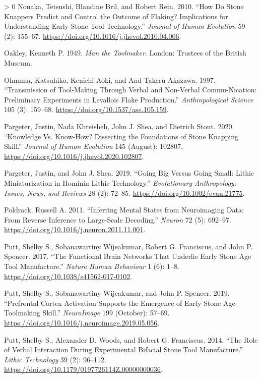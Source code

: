 \documentclass[smallextended]{svjour3}       %
\newlength{\cslhangindent}
\newenvironment{CSLReferences}[3] %
 {%
  \setlength{\parindent}{0pt}
  \ifodd #1 \everypar{\setlength{\hangindent}{\cslhangindent}}\ignorespaces\fi
  \ifnum #2 > 0
  \setlength{\parskip}{#3\baselineskip}
  \fi
 }%
 {}
\begin{document}
\begin{CSLReferences}{1}{0}
\leavevmode\hypertarget{ref-nonaka2010}{}%
Nonaka, Tetsushi, Blandine Bril, and Robert Rein. 2010. {``How Do Stone
Knappers Predict and Control the Outcome of Flaking? Implications for
Understanding Early Stone Tool Technology.''} \emph{Journal of Human
Evolution} 59 (2): 155--67.
\url{https://doi.org/10.1016/j.jhevol.2010.04.006}.

\leavevmode\hypertarget{ref-oakley1949}{}%
Oakley, Kenneth P. 1949. \emph{Man the Toolmaker}. London: Trustees of
the British Museum.

\leavevmode\hypertarget{ref-ohnuma1997}{}%
Ohnuma, Katsuhiko, Kenichi Aoki, and And Takeru Akazawa. 1997.
{``Transmission of Tool-Making Through Verbal and Non-Verbal
Commu-Nication: Preliminary Experiments in Levallois Flake
Production.''} \emph{Anthropological Science} 105 (3): 159--68.
\url{https://doi.org/10.1537/ase.105.159}.

\leavevmode\hypertarget{ref-pargeter2020}{}%
Pargeter, Justin, Nada Khreisheh, John J. Shea, and Dietrich Stout.
2020. {``Knowledge Vs. Know-How? Dissecting the Foundations of Stone
Knapping Skill.''} \emph{Journal of Human Evolution} 145 (August):
102807. \url{https://doi.org/10.1016/j.jhevol.2020.102807}.

\leavevmode\hypertarget{ref-pargeter2019}{}%
Pargeter, Justin, and John J. Shea. 2019. {``Going Big Versus Going
Small: Lithic Miniaturization in Hominin Lithic Technology.''}
\emph{Evolutionary Anthropology: Issues, News, and Reviews} 28 (2):
72--85. \url{https://doi.org/10.1002/evan.21775}.

\leavevmode\hypertarget{ref-poldrack2011}{}%
Poldrack, Russell A. 2011. {``Inferring Mental States from Neuroimaging
Data: From Reverse Inference to Large-Scale Decoding.''} \emph{Neuron}
72 (5): 692--97. \url{https://doi.org/10.1016/j.neuron.2011.11.001}.

\leavevmode\hypertarget{ref-putt2017}{}%
Putt, Shelby S., Sobanawartiny Wijeakumar, Robert G. Franciscus, and
John P. Spencer. 2017. {``The Functional Brain Networks That Underlie
Early Stone Age Tool Manufacture.''} \emph{Nature Human Behaviour} 1
(6): 1--8. \url{https://doi.org/10.1038/s41562-017-0102}.

\leavevmode\hypertarget{ref-putt2019}{}%
Putt, Shelby S., Sobanawartiny Wijeakumar, and John P. Spencer. 2019.
{``Prefrontal Cortex Activation Supports the Emergence of Early Stone
Age Toolmaking Skill.''} \emph{NeuroImage} 199 (October): 57--69.
\url{https://doi.org/10.1016/j.neuroimage.2019.05.056}.

\leavevmode\hypertarget{ref-putt2014}{}%
Putt, Shelby S., Alexander D. Woods, and Robert G. Franciscus. 2014.
{``The Role of Verbal Interaction During Experimental Bifacial Stone
Tool Manufacture.''} \emph{Lithic Technology} 39 (2): 96--112.
\url{https://doi.org/10.1179/0197726114Z.00000000036}.


\end{CSLReferences}
\end{document}
